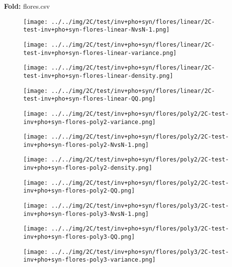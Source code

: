 \textbf{Fold:} flores.csv
\begin{figure}[H]
\centering	\texttt{[image: ../../img/2C/test/inv+pho+syn/flores/linear/2C-test-inv+pho+syn-flores-linear-NvsN-1.png]}
\end{figure}
\begin{figure}[H]
\centering	\texttt{[image: ../../img/2C/test/inv+pho+syn/flores/linear/2C-test-inv+pho+syn-flores-linear-variance.png]}
\end{figure}
\begin{figure}[H]
\centering	\texttt{[image: ../../img/2C/test/inv+pho+syn/flores/linear/2C-test-inv+pho+syn-flores-linear-density.png]}
\end{figure}
\begin{figure}[H]
\centering	\texttt{[image: ../../img/2C/test/inv+pho+syn/flores/linear/2C-test-inv+pho+syn-flores-linear-QQ.png]}
\end{figure}
\begin{figure}[H]
\centering	\texttt{[image: ../../img/2C/test/inv+pho+syn/flores/poly2/2C-test-inv+pho+syn-flores-poly2-variance.png]}
\end{figure}
\begin{figure}[H]
\centering	\texttt{[image: ../../img/2C/test/inv+pho+syn/flores/poly2/2C-test-inv+pho+syn-flores-poly2-NvsN-1.png]}
\end{figure}
\begin{figure}[H]
\centering	\texttt{[image: ../../img/2C/test/inv+pho+syn/flores/poly2/2C-test-inv+pho+syn-flores-poly2-density.png]}
\end{figure}
\begin{figure}[H]
\centering	\texttt{[image: ../../img/2C/test/inv+pho+syn/flores/poly2/2C-test-inv+pho+syn-flores-poly2-QQ.png]}
\end{figure}
\begin{figure}[H]
\centering	\texttt{[image: ../../img/2C/test/inv+pho+syn/flores/poly3/2C-test-inv+pho+syn-flores-poly3-NvsN-1.png]}
\end{figure}
\begin{figure}[H]
\centering	\texttt{[image: ../../img/2C/test/inv+pho+syn/flores/poly3/2C-test-inv+pho+syn-flores-poly3-QQ.png]}
\end{figure}
\begin{figure}[H]
\centering	\texttt{[image: ../../img/2C/test/inv+pho+syn/flores/poly3/2C-test-inv+pho+syn-flores-poly3-variance.png]}
\end{figure}
